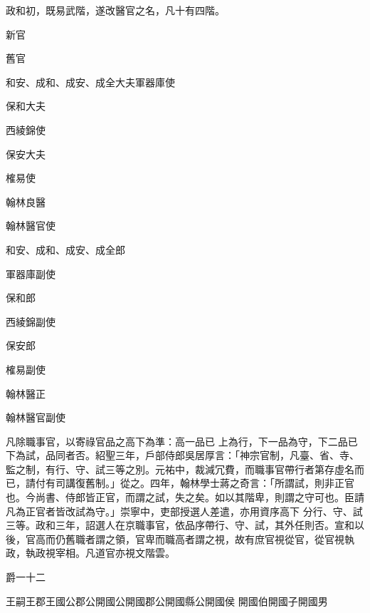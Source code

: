 \begin{pinyinscope}
 政和初，既易武階，遂改醫官之名，凡十有四階。



 新官



 舊官



 和安、成和、成安、成全大夫軍器庫使



 保和大夫



 西綾錦使



 保安大夫



 榷易使



 翰林良醫



 翰林醫官使



 和安、成和、成安、成全郎



 軍器庫副使



 保和郎



 西綾錦副使



 保安郎



 榷易副使



 翰林醫正



 翰林醫官副使



 凡除職事官，以寄祿官品之高下為準：高一品已
 上為行，下一品為守，下二品已下為試，品同者否。紹聖三年，戶部侍郎吳居厚言：「神宗官制，凡臺、省、寺、監之制，有行、守、試三等之別。元祐中，裁減冗費，而職事官帶行者第存虛名而已，請付有司講復舊制。」從之。四年，翰林學士蔣之奇言：「所謂試，則非正官也。今尚書、侍郎皆正官，而謂之試，失之矣。如以其階卑，則謂之守可也。臣請凡為正官者皆改試為守。」崇寧中，吏部授選人差遣，亦用資序高下
 分行、守、試三等。政和三年，詔選人在京職事官，依品序帶行、守、試，其外任則否。宣和以後，官高而仍舊職者謂之領，官卑而職高者謂之視，故有庶官視從官，從官視執政，執政視宰相。凡道官亦視文階雲。



 爵一十二



 王嗣王郡王國公郡公開國公開國郡公開國縣公開國侯
 開國伯開國子開國男




\end{pinyinscope}
